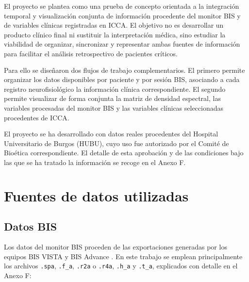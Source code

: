 \documentclass[
  spanish,
  a4paper,
  12pt,
  twoside]{memoir}
\begin{document}
El proyecto se plantea como una prueba de concepto orientada a la
integración temporal y visualización conjunta de información procedente
del monitor BIS y de variables clínicas registradas en ICCA. El objetivo
no es desarrollar un producto clínico final ni sustituir la
interpretación médica, sino estudiar la viabilidad de organizar,
sincronizar y representar ambas fuentes de información para facilitar el
análisis retrospectivo de pacientes críticos.

Para ello se diseñaron dos flujos de trabajo complementarios. El primero
permite organizar los datos disponibles por paciente y por sesión BIS,
asociando a cada registro neurofisiológico la información clínica
correspondiente. El segundo permite visualizar de forma conjunta la
matriz de densidad espectral, las variables procesadas del monitor BIS y
las variables clínicas seleccionadas procedentes de ICCA.

El proyecto se ha desarrollado con datos reales procedentes del Hospital
Universitario de Burgos (HUBU), cuyo uso fue autorizado por el Comité de
Bioética correspondiente. El detalle de esta aprobación y de las
condiciones bajo las que se ha tratado la información se recoge en el
Anexo F.

\section{Fuentes de datos utilizadas}\label{fuentes-de-datos-utilizadas}

\subsection{Datos BIS}\label{datos-bis}

Los datos del monitor BIS proceden de las exportaciones generadas por
los equipos BIS VISTA y BIS Advance
\citep{CovidienBISadvanced, CovidienSerial2010}. En este trabajo se
emplean principalmente los archivos \texttt{.spa}, \texttt{.f\_a},
\texttt{.r2a} o \texttt{.r4a}, \texttt{.h\_a} y \texttt{.t\_a},
explicados con detalle en el Anexo F:
\end{document}
